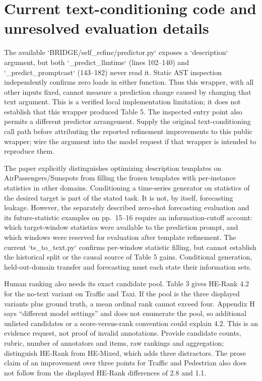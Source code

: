 \documentclass[10pt]{article}
\begin{document}
\section*{Current text-conditioning code and unresolved evaluation details}
The available `BRIDGE/self\_refine/predictor.py` exposes a `description` argument, but both `\_predict\_llmtime` (lines 102–140) and `\_predict\_promptcast` (143–182) never read it. Static AST inspection independently confirms zero loads in either function. Thus this wrapper, with all other inputs fixed, cannot measure a prediction change caused by changing that text argument. This is a verified local implementation limitation; it does not establish that this wrapper produced Table 5. The inspected entry point also permits a different predictor arrangement. Supply the original text-conditioning call path before attributing the reported refinement improvements to this public wrapper; wire the argument into the model request if that wrapper is intended to reproduce them.\par
The paper explicitly distinguishes optimizing description templates on AirPassengers/Sunspots from filling the frozen templates with per-instance statistics in other domains. Conditioning a time-series generator on statistics of the desired target is part of the stated task. It is not, by itself, forecasting leakage. However, the separately described zero-shot forecasting evaluation and its future-statistic examples on pp. 15–16 require an information-cutoff account: which target-window statistics were available to the prediction prompt, and which windows were reserved for evaluation after template refinement. The current `ts\_to\_text.py` confirms per-window statistic filling, but cannot establish the historical split or the causal source of Table 5 gains. Conditional generation, held-out-domain transfer and forecasting must each state their information sets.\par
Human ranking also needs its exact candidate pool. Table 3 gives HE-Rank 4.2 for the no-text variant on Traffic and Taxi. If the pool is the three displayed variants plus ground truth, a mean ordinal rank cannot exceed four. Appendix H says “different model settings” and does not enumerate the pool, so additional unlisted candidates or a score-versus-rank convention could explain 4.2. This is an evidence request, not proof of invalid annotations. Provide candidate counts, rubric, number of annotators and items, raw rankings and aggregation; distinguish HE-Rank from HE-Mixed, which adds three distractors. The prose claim of an improvement over three points for Traffic and Pedestrian also does not follow from the displayed HE-Rank differences of 2.8 and 1.1.\par
\end{document}
